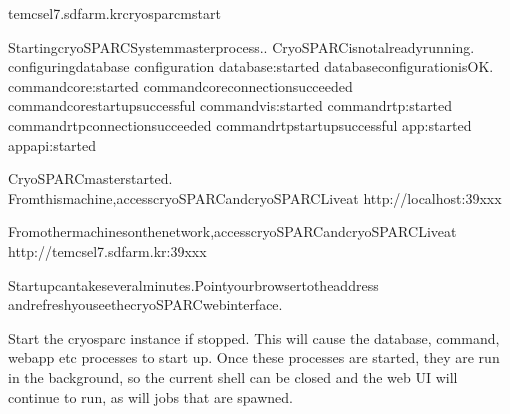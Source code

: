 \documentclass[a4paper,11pt,english]{sphinxmanual}
\begin{document}
\begin{sphinxVerbatim}[commandchars=\\\{\}]
tem\PYGZhy{}cs\PYGZhy{}el7.sdfarm.kr\PYGZdl{}\PYGZgt{}cryosparcmstart

StartingcryoSPARCSystemmasterprocess..
CryoSPARCisnotalreadyrunning.
configuringdatabase
configuration
database:started
databaseconfigurationisOK.
command\PYGZus{}core:started
command\PYGZus{}coreconnectionsucceeded
command\PYGZus{}corestartupsuccessful
command\PYGZus{}vis:started
command\PYGZus{}rtp:started
command\PYGZus{}rtpconnectionsucceeded
command\PYGZus{}rtpstartupsuccessful
app:started
app\PYGZus{}api:started
\PYGZhy{}\PYGZhy{}\PYGZhy{}\PYGZhy{}\PYGZhy{}\PYGZhy{}\PYGZhy{}\PYGZhy{}\PYGZhy{}\PYGZhy{}\PYGZhy{}\PYGZhy{}\PYGZhy{}\PYGZhy{}\PYGZhy{}\PYGZhy{}\PYGZhy{}\PYGZhy{}\PYGZhy{}\PYGZhy{}\PYGZhy{}\PYGZhy{}\PYGZhy{}\PYGZhy{}\PYGZhy{}\PYGZhy{}\PYGZhy{}\PYGZhy{}\PYGZhy{}\PYGZhy{}\PYGZhy{}\PYGZhy{}\PYGZhy{}\PYGZhy{}\PYGZhy{}\PYGZhy{}\PYGZhy{}\PYGZhy{}\PYGZhy{}\PYGZhy{}\PYGZhy{}\PYGZhy{}\PYGZhy{}\PYGZhy{}\PYGZhy{}\PYGZhy{}\PYGZhy{}\PYGZhy{}\PYGZhy{}\PYGZhy{}\PYGZhy{}\PYGZhy{}\PYGZhy{}

CryoSPARCmasterstarted.
Fromthismachine,accesscryoSPARCandcryoSPARCLiveat
http://localhost:39xxx

Fromothermachinesonthenetwork,accesscryoSPARCandcryoSPARCLiveat
http://tem\PYGZhy{}cs\PYGZhy{}el7.sdfarm.kr:39xxx


Startupcantakeseveralminutes.Pointyourbrowsertotheaddress
andrefreshyouseethecryoSPARCwebinterface.
\end{sphinxVerbatim}

\sphinxAtStartPar
Start the cryosparc instance if stopped. This will cause the database, command, webapp etc processes to start up.
Once these processes are started, they are run in the background, so the current shell can be closed and the web UI will continue to run, as will jobs that are spawned.
\end{document}
